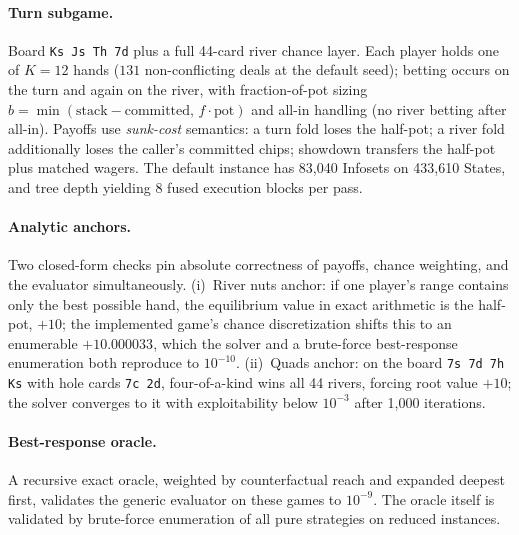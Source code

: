 \paragraph{Turn subgame.}
Board \texttt{Ks Js Th 7d} plus a full 44-card river chance layer. Each player holds
one of $K{=}12$ hands ($131$ non-conflicting deals at the default seed); betting
occurs on the turn and again on the river, with fraction-of-pot sizing
$b = \min(\text{stack} - \text{committed},\, f \cdot \text{pot})$ and all-in handling
(no river betting after all-in). Payoffs use \emph{sunk-cost} semantics: a turn fold
loses the half-pot; a river fold additionally loses the caller's committed chips;
showdown transfers the half-pot plus matched wagers. The default instance has
83{,}040 Infosets on 433{,}610 States, and tree depth yielding 8 fused execution
blocks per pass.

\paragraph{Analytic anchors.}
Two closed-form checks pin absolute correctness of payoffs, chance weighting, and the
evaluator simultaneously. (i)~River nuts anchor: if one player's range contains only
the best possible hand, the equilibrium value in exact arithmetic is the half-pot,
$+10$; the implemented game's chance discretization shifts this to an enumerable
$+10.000033$, which the solver and a brute-force best-response enumeration both
reproduce to $10^{-10}$.
(ii)~Quads anchor: on the board \texttt{7s 7d 7h Ks} with hole cards \texttt{7c 2d},
four-of-a-kind wins all 44 rivers, forcing root value $+10$; the solver converges to
it with exploitability below $10^{-3}$ after 1{,}000 iterations.

\paragraph{Best-response oracle.}
A recursive exact oracle, weighted by counterfactual reach and expanded deepest
first, validates the generic evaluator on these games to $10^{-9}$. The oracle itself is
validated by brute-force enumeration of all pure strategies on reduced instances.

